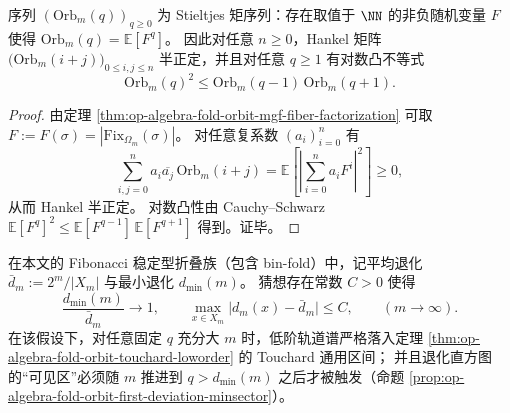 \begin{proposition}\label{prop:op-algebra-fold-orbit-stieltjes-hankel-logconvex}
序列 \((\mathrm{Orb}_m(q))_{q\ge 0}\) 为 Stieltjes 矩序列：存在取值于 \(\NN\) 的非负随机变量 \(F\) 使得 \(\mathrm{Orb}_m(q)=\mathbb E[F^q]\)。
因此对任意 \(n\ge 0\)，Hankel 矩阵 \(\bigl(\mathrm{Orb}_m(i+j)\bigr)_{0\le i,j\le n}\) 半正定，并且对任意 \(q\ge 1\) 有对数凸不等式
\[
\mathrm{Orb}_m(q)^2\le \mathrm{Orb}_m(q-1)\,\mathrm{Orb}_m(q+1).
\]
\end{proposition}
\begin{proof}
由定理 \ref{thm:op-algebra-fold-orbit-mgf-fiber-factorization} 可取 \(F:=F(\sigma)=|\mathrm{Fix}_{\Omega_m}(\sigma)|\)。
对任意复系数 \((a_i)_{i=0}^n\) 有
\[
\sum_{i,j=0}^{n}a_i\overline{a_j}\,\mathrm{Orb}_m(i+j)
=\mathbb E\!\left[\left|\sum_{i=0}^{n}a_i F^i\right|^2\right]\ge 0,
\]
从而 Hankel 半正定。
对数凸性由 Cauchy--Schwarz
\(
\mathbb E[F^q]^2\le \mathbb E[F^{q-1}]\,\mathbb E[F^{q+1}]
\)
得到。证毕。
\end{proof}

\begin{conjecture}\label{conj:op-algebra-fold-orbit-asymptotic-near-regularity}
在本文的 Fibonacci 稳定型折叠族（包含 bin-fold）中，记平均退化
\(
\bar d_m:=2^m/|X_m|
\)
与最小退化 \(d_{\min}(m)\)。
猜想存在常数 \(C>0\) 使得
\[
\frac{d_{\min}(m)}{\bar d_m}\longrightarrow 1,
\qquad
\max_{x\in X_m}\bigl|d_m(x)-\bar d_m\bigr|\le C,
\qquad(m\to\infty).
\]
在该假设下，对任意固定 \(q\) 充分大 \(m\) 时，低阶轨道谱严格落入定理 \ref{thm:op-algebra-fold-orbit-touchard-loworder} 的 Touchard 通用区间；
并且退化直方图的“可见区”必须随 \(m\) 推进到 \(q>d_{\min}(m)\) 之后才被触发（命题 \ref{prop:op-algebra-fold-orbit-first-deviation-minsector}）。
\end{conjecture}
